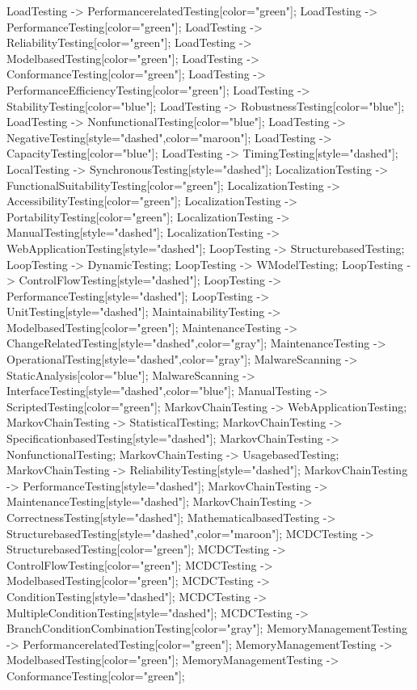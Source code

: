 \documentclass{article}
\begin{document}
{LoadTesting -> PerformancerelatedTesting[color="green"];
LoadTesting -> PerformanceTesting[color="green"];
LoadTesting -> ReliabilityTesting[color="green"];
LoadTesting -> ModelbasedTesting[color="green"];
LoadTesting -> ConformanceTesting[color="green"];
LoadTesting -> PerformanceEfficiencyTesting[color="green"];
LoadTesting -> StabilityTesting[color="blue"];
LoadTesting -> RobustnessTesting[color="blue"];
LoadTesting -> NonfunctionalTesting[color="blue"];
LoadTesting -> NegativeTesting[style="dashed",color="maroon"];
LoadTesting -> CapacityTesting[color="blue"];
LoadTesting -> TimingTesting[style="dashed"];
LocalTesting -> SynchronousTesting[style="dashed"];
LocalizationTesting -> FunctionalSuitabilityTesting[color="green"];
LocalizationTesting -> AccessibilityTesting[color="green"];
LocalizationTesting -> PortabilityTesting[color="green"];
LocalizationTesting -> ManualTesting[style="dashed"];
LocalizationTesting -> WebApplicationTesting[style="dashed"];
LoopTesting -> StructurebasedTesting;
LoopTesting -> DynamicTesting;
LoopTesting -> WModelTesting;
LoopTesting -> ControlFlowTesting[style="dashed"];
LoopTesting -> PerformanceTesting[style="dashed"];
LoopTesting -> UnitTesting[style="dashed"];
MaintainabilityTesting -> ModelbasedTesting[color="green"];
MaintenanceTesting -> ChangeRelatedTesting[style="dashed",color="gray"];
MaintenanceTesting -> OperationalTesting[style="dashed",color="gray"];
MalwareScanning -> StaticAnalysis[color="blue"];
MalwareScanning -> InterfaceTesting[style="dashed",color="blue"];
ManualTesting -> ScriptedTesting[color="green"];
MarkovChainTesting -> WebApplicationTesting;
MarkovChainTesting -> StatisticalTesting;
MarkovChainTesting -> SpecificationbasedTesting[style="dashed"];
MarkovChainTesting -> NonfunctionalTesting;
MarkovChainTesting -> UsagebasedTesting;
MarkovChainTesting -> ReliabilityTesting[style="dashed"];
MarkovChainTesting -> PerformanceTesting[style="dashed"];
MarkovChainTesting -> MaintenanceTesting[style="dashed"];
MarkovChainTesting -> CorrectnessTesting[style="dashed"];
MathematicalbasedTesting -> StructurebasedTesting[style="dashed",color="maroon"];
MCDCTesting -> StructurebasedTesting[color="green"];
MCDCTesting -> ControlFlowTesting[color="green"];
MCDCTesting -> ModelbasedTesting[color="green"];
MCDCTesting -> ConditionTesting[style="dashed"];
MCDCTesting -> MultipleConditionTesting[style="dashed"];
MCDCTesting -> BranchConditionCombinationTesting[color="gray"];
MemoryManagementTesting -> PerformancerelatedTesting[color="green"];
MemoryManagementTesting -> ModelbasedTesting[color="green"];
MemoryManagementTesting -> ConformanceTesting[color="green"];
}
\end{document}
